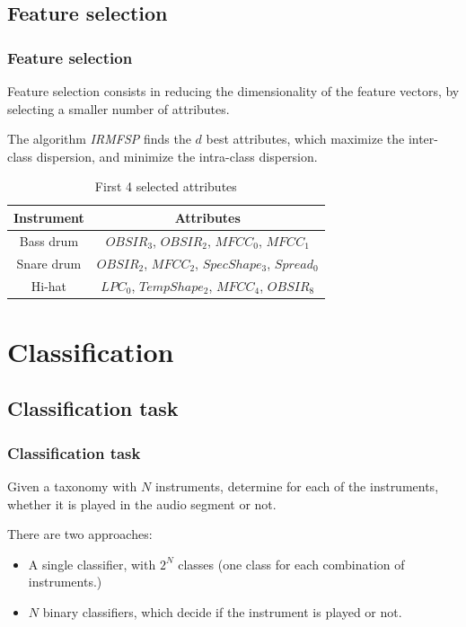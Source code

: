 \documentclass{beamer}
\begin{document}
    \subsection{Feature selection}
    \begin{frame}
        \frametitle{Feature selection}
        Feature selection consists in reducing the dimensionality of the feature vectors, by selecting a smaller number of attributes.
        \vspace{0.3cm}

        The algorithm \emph{IRMFSP} finds the $d$ best attributes, which maximize the inter-class dispersion, and minimize the intra-class dispersion.
        \begin{center}
        \begin{table}
        \caption{First 4 selected attributes}
        \begin{tabular}{|c|c|}
        \hline
        Instrument&Attributes\\
        \hline
        Bass drum&$OBSIR_3$, $OBSIR_2$, $MFCC_0$, $MFCC_1$\\
        \hline
        Snare drum&$OBSIR_2$, $MFCC_2$, $SpecShape_3$, $Spread_0$\\
        \hline
        Hi-hat&$LPC_0$, $TempShape_2$, $MFCC_4$, $OBSIR_8$\\
        \hline
        \end{tabular}
        \end{table}
        \end{center}
    \end{frame}
    \section{Classification}
    \subsection{Classification task}
    \begin{frame}
        \frametitle{Classification task}
        Given a taxonomy with $N$ instruments, determine for each of the instruments, whether it is played in the audio segment or not.
        \vspace{0.3cm}

        There are two approaches:
        \begin{itemize}
            \item A single classifier, with $2^N$ classes (one class for each combination of instruments.)
            \item $N$ binary classifiers, which decide if the instrument is played or not.
        \end{itemize}
    \end{frame}
\end{document}
